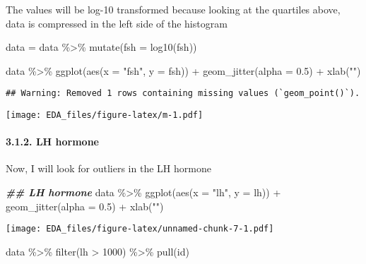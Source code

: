 \documentclass[
]{article}
\newenvironment{Shaded}{\begin{snugshade}}{\end{snugshade}}
\newcommand{\AttributeTok}[1]{\textcolor[rgb]{0.77,0.63,0.00}{#1}}
\newcommand{\DecValTok}[1]{\textcolor[rgb]{0.00,0.00,0.81}{#1}}
\newcommand{\DocumentationTok}[1]{\textcolor[rgb]{0.56,0.35,0.01}{\textbf{\textit{#1}}}}
\newcommand{\FloatTok}[1]{\textcolor[rgb]{0.00,0.00,0.81}{#1}}
\newcommand{\FunctionTok}[1]{\textcolor[rgb]{0.00,0.00,0.00}{#1}}
\newcommand{\NormalTok}[1]{#1}
\newcommand{\OtherTok}[1]{\textcolor[rgb]{0.56,0.35,0.01}{#1}}
\newcommand{\SpecialCharTok}[1]{\textcolor[rgb]{0.00,0.00,0.00}{#1}}
\newcommand{\StringTok}[1]{\textcolor[rgb]{0.31,0.60,0.02}{#1}}
\begin{document}
The values will be log-10 transformed because looking at the quartiles
above, data is compressed in the left side of the histogram

\begin{Shaded}
\begin{Highlighting}[]
\NormalTok{data }\OtherTok{=}\NormalTok{ data }\SpecialCharTok{\%\textgreater{}\%} 
  \FunctionTok{mutate}\NormalTok{(}\AttributeTok{fsh =} \FunctionTok{log10}\NormalTok{(fsh))}

\NormalTok{data }\SpecialCharTok{\%\textgreater{}\%} 
  \FunctionTok{ggplot}\NormalTok{(}\FunctionTok{aes}\NormalTok{(}\AttributeTok{x =} \StringTok{"fsh"}\NormalTok{, }\AttributeTok{y =}\NormalTok{ fsh)) }\SpecialCharTok{+}
  \FunctionTok{geom\_jitter}\NormalTok{(}\AttributeTok{alpha =} \FloatTok{0.5}\NormalTok{) }\SpecialCharTok{+}
  \FunctionTok{xlab}\NormalTok{(}\StringTok{""}\NormalTok{)}
\end{Highlighting}
\end{Shaded}

\begin{verbatim}
## Warning: Removed 1 rows containing missing values (`geom_point()`).
\end{verbatim}

\texttt{[image: EDA\_files/figure-latex/m-1.pdf]}

\hypertarget{lh-hormone}{%
\paragraph{3.1.2. LH hormone}\label{lh-hormone}}

Now, I will look for outliers in the LH hormone

\begin{Shaded}
\begin{Highlighting}[]
\DocumentationTok{\#\# LH hormone }
\NormalTok{data }\SpecialCharTok{\%\textgreater{}\%} 
  \FunctionTok{ggplot}\NormalTok{(}\FunctionTok{aes}\NormalTok{(}\AttributeTok{x =} \StringTok{"lh"}\NormalTok{, }\AttributeTok{y =}\NormalTok{ lh)) }\SpecialCharTok{+}
  \FunctionTok{geom\_jitter}\NormalTok{(}\AttributeTok{alpha =} \FloatTok{0.5}\NormalTok{) }\SpecialCharTok{+}
  \FunctionTok{xlab}\NormalTok{(}\StringTok{""}\NormalTok{)}
\end{Highlighting}
\end{Shaded}

\texttt{[image: EDA\_files/figure-latex/unnamed-chunk-7-1.pdf]}

\begin{Shaded}
\begin{Highlighting}[]
\NormalTok{data }\SpecialCharTok{\%\textgreater{}\%} 
  \FunctionTok{filter}\NormalTok{(lh }\SpecialCharTok{\textgreater{}} \DecValTok{1000}\NormalTok{) }\SpecialCharTok{\%\textgreater{}\%} 
  \FunctionTok{pull}\NormalTok{(id)}
\end{Highlighting}
\end{Shaded}
\end{document}
